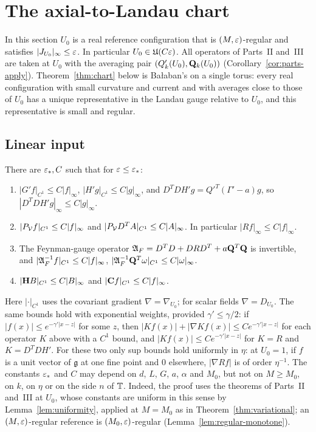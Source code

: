 \section{The axial-to-Landau chart}\label{sec:chart}

In this section $U_0$ is a real reference configuration that is $(M,\varepsilon)$-regular and satisfies $|J_{U_0}|_\infty\le\varepsilon$. In particular $U_0\in\mathfrak U(C\varepsilon)$. All operators of Parts~II and~III are taken at $U_0$ with the averaging pair $(Q'_k(U_0),\mathbf Q_k(U_0))$ (Corollary~\ref{cor:parts-apply}). Theorem~\ref{thm:chart} below is Ba\l aban's \cite[Theorem~2]{BalReg} on a single torus: every real configuration with small curvature and current and with averages close to those of $U_0$ has a unique representative in the Landau gauge relative to $U_0$, and this representative is small and regular.

\subsection{Linear input}

\begin{lemma}\label{lem:sup-bounds}
There are $\varepsilon_*,C$ such that for $\varepsilon\le\varepsilon_*$:
\begin{enumerate}[label=(\alph*)]
\item $|G'f|_{C^1}\le C|f|_\infty$, $|H'g|_{C^1}\le C|g|_\infty$, and $D^TDH'g=Q'^T(\Gamma'-a)g$, so $|D^TDH'g|_\infty\le C|g|_\infty$.
\item $|P_\mathcal V f|_{C^1}\le C|f|_\infty$ and $|P_\mathcal V D^TA|_{C^1}\le C|A|_\infty$. In particular $|Rf|_\infty\le C|f|_\infty$.
\item The Feynman-gauge operator $\mathfrak A_F=D^TD+DRD^T+a\mathbf Q^T\mathbf Q$ is invertible, and $|\mathfrak A_F^{-1}f|_{C^1}\le C|f|_\infty$, $|\mathfrak A_F^{-1}\mathbf Q^T\omega|_{C^1}\le C|\omega|_\infty$.
\item $|\mathbf H B|_{C^1}\le C|B|_\infty$ and $|\mathbf C f|_{C^1}\le C|f|_\infty$.
\end{enumerate}
Here $|\cdot|_{C^1}$ uses the covariant gradient $\nabla=\nabla_{U_0}$; for scalar fields $\nabla=D_{U_0}$. The same bounds hold with exponential weights, provided $\gamma'\le\gamma/2$: if $|f(x)|\le e^{-\gamma'|x-z|}$ for some $z$, then $|Kf(x)|+|\nabla Kf(x)|\le Ce^{-\gamma'|x-z|}$ for each operator $K$ above with a $C^1$ bound, and $|Kf(x)|\le Ce^{-\gamma'|x-z|}$ for $K=R$ and $K=D^TDH'$. For these two only sup bounds hold uniformly in $\eta$: at $U_0=1$, if $f$ is a unit vector of $\mathfrak g$ at one fine point and $0$ elsewhere, $|\nabla Rf|$ is of order $\eta^{-1}$. The constants $\varepsilon_*$ and $C$ may depend on $d$, $L$, $G$, $a$, $\alpha$ and $M_0$, but not on $M\ge M_0$, on $k$, on $\eta$ or on the side $n$ of $\mathbb T$. Indeed, the proof uses the theorems of Parts~II and~III at $U_0$, whose constants are uniform in this sense by Lemma~\ref{lem:uniformity}, applied at $M=M_0$ as in Theorem~\ref{thm:variational}; an $(M,\varepsilon)$-regular reference is $(M_0,\varepsilon)$-regular (Lemma~\ref{lem:regular-monotone}).
\end{lemma}

